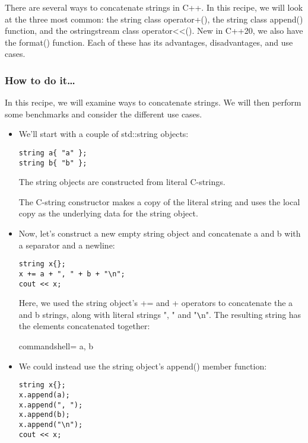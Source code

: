 
There are several ways to concatenate strings in C++. In this recipe, we will look at the three most common: the string class operator+(), the string class append() function, and the ostringstream class operator<{}<(). New in C++20, we also have the format() function. Each of these has its advantages, disadvantages, and use cases.

\subsubsection{How to do it…}

In this recipe, we will examine ways to concatenate strings. We will then perform some benchmarks and consider the different use cases.

\begin{itemize}
\item 
We'll start with a couple of std::string objects:

\begin{lstlisting}[style=styleCXX]
string a{ "a" };
string b{ "b" };
\end{lstlisting}

The string objects are constructed from literal C-strings.

The C-string constructor makes a copy of the literal string and uses the local copy as the underlying data for the string object.

\item 
Now, let's construct a new empty string object and concatenate a and b with a separator and a newline:

\begin{lstlisting}[style=styleCXX]
string x{};
x += a + ", " + b + "\n";
cout << x;
\end{lstlisting}

Here, we used the string object's += and + operators to concatenate the a and b strings, along with literal strings ", " and "\verb|\|n". The resulting string has the elements concatenated together:

\begin{tcblisting}{commandshell={}}
a, b
\end{tcblisting}

\item 
We could instead use the string object's append() member function:

\begin{lstlisting}[style=styleCXX]
string x{};
x.append(a);
x.append(", ");
x.append(b);
x.append("\n");
cout << x;
\end{lstlisting}


\end{itemize}
